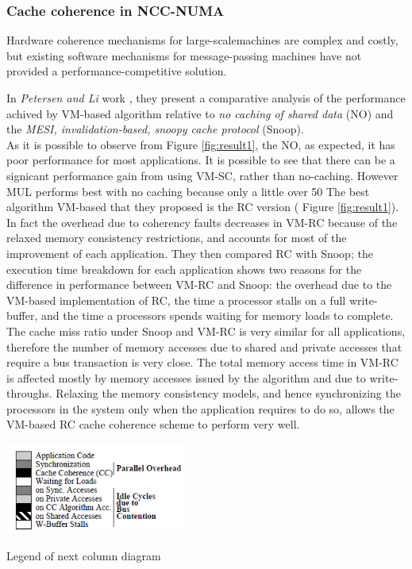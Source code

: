 \documentclass[a4paper,10pt]{article}
\makeatletter
\newenvironment{figurehere}{\def\@captype{figure}\vspace{2ex}}{\vspace{2ex}}
\makeatother
\begin{document}
\begin{multicols}{2}
\subsubsection{Cache coherence in NCC-NUMA}
Hardware coherence mechanisms for large-scalemachines are complex and costly, but existing software mechanisms for message-passing machines have not provided a performance-competitive solution. \par 
\parindent 10mm In  \emph{Petersen and Li} work \cite{Li95multiprocessorcache},  they present a comparative analysis of the performance achived by VM-based algorithm relative to \emph{no caching of shared data} (NO) and the \emph{MESI, invalidation-based, snoopy cache protocol} (Snoop). \\
As it is possible to observe from Figure \ref{fig:result1}, the NO, as expected, it has poor performance for most applications. It is possible to see that there can be a signicant performance gain from using VM-SC, rather than no-caching. However MUL performs best with no caching because only a little over 50%
\parindent 10mm The best algorithm VM-based that they proposed is the RC version ( Figure \ref{fig:result1}). In fact the overhead due to coherency faults decreases in VM-RC because of the relaxed memory consistency restrictions, and accounts for most of the improvement of each application. They then compared RC with Snoop; the execution time breakdown for each application shows two reasons for the difference in performance between VM-RC and Snoop: the overhead due to the VM-based implementation of RC, the time a processor stalls on a full write-buffer, and the time a processors spends waiting for memory loads to complete. The cache miss ratio under Snoop and VM-RC is very similar for all applications, therefore the number of memory accesses due to shared and private accesses that require a bus transaction is very close. The total memory access time in VM-RC is affected mostly by memory  accesses issued by the algorithm and due to write-throughs. Relaxing the memory consistency models, and hence synchronizing the processors in the system only  when the application requires to do so, allows the VM-based RC cache coherence scheme to perform very well. 


\begin{figurehere}
 \centering
 \includegraphics[width=6cm, height=3cm]{./eps/Legenda_VM-based.PNG}
 \caption{Legend of next column diagram}
 \label{fig:legend}
\end{figurehere}


\end{multicols}
\end{document}

